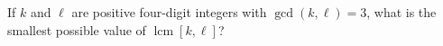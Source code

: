 If $k$ and $\ell$ are positive four-digit integers with $\gcd(k,\ell)=3$, what is the smallest possible value of $\operatorname{lcm}[k,\ell]$?
